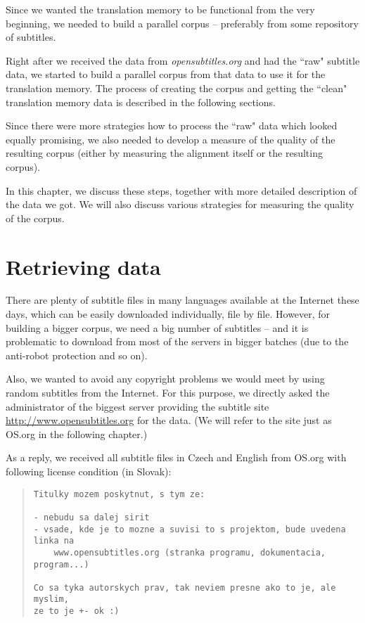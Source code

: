 \label{chap:building_corpus}

Since we wanted the translation memory to be functional from the very beginning, we needed to build a parallel corpus -- preferably from some repository of subtitles. 

Right after we received the data from \emph{opensubtitles.org} and had the ``raw" subtitle data, we started to build a parallel corpus from that data to use it for the translation memory. The process of creating the corpus and getting the ``clean" translation memory data is described in the following sections.

Since there were more strategies how to process the ``raw" data which looked equally promising, we also needed to develop a measure of the quality of the resulting corpus (either by measuring the alignment itself or the resulting corpus).

In this chapter, we discuss these steps, together with more detailed description of the data we got. We will also discuss various strategies for measuring the quality of the corpus.

\section{Retrieving data}

There are plenty of subtitle files in many languages available at the Internet these days, which can be easily downloaded individually, file by file. However, for building a bigger corpus, we need a big number of subtitles -- and it is problematic to download from most of the servers in bigger batches (due to the anti-robot protection and so on). 

Also, we wanted to avoid any copyright problems we would meet by using random subtitles from the Internet. For this purpose, we directly asked the administrator of the biggest server providing the subtitle site \url{http://www.opensubtitles.org} for the data. (We will refer to the site just as OS.org in the following chapter.)

As a reply, we received all subtitle files in Czech and English from OS.org with following license condition (in Slovak):

\begin{quote}
\begin{verbatim}
Titulky mozem poskytnut, s tym ze:

- nebudu sa dalej sirit
- vsade, kde je to mozne a suvisi to s projektom, bude uvedena linka na
    www.opensubtitles.org (stranka programu, dokumentacia, program...)

Co sa tyka autorskych prav, tak neviem presne ako to je, ale myslim,
ze to je +- ok :)
\end{verbatim}
\end{quote}

